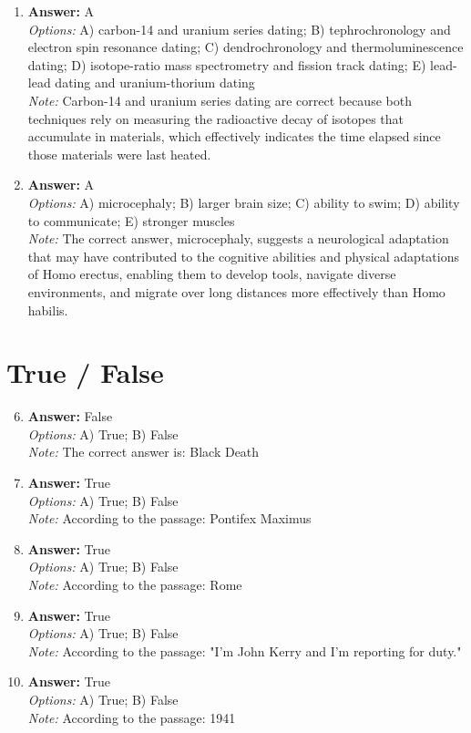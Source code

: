 \documentclass[12pt]{article}
\begin{document}
\begin{enumerate}[label=\arabic*.]
\item \textbf{Answer:} A
\\ \textit{Options:} A) carbon-14 and uranium series dating; B) tephrochronology and electron spin resonance dating; C) dendrochronology and thermoluminescence dating; D) isotope-ratio mass spectrometry and fission track dating; E) lead-lead dating and uranium-thorium dating
\\ \textit{Note:} Carbon-14 and uranium series dating are correct because both techniques rely on measuring the radioactive decay of isotopes that accumulate in materials, which effectively indicates the time elapsed since those materials were last heated.
\item \textbf{Answer:} A
\\ \textit{Options:} A) microcephaly; B) larger brain size; C) ability to swim; D) ability to communicate; E) stronger muscles
\\ \textit{Note:} The correct answer, microcephaly, suggests a neurological adaptation that may have contributed to the cognitive abilities and physical adaptations of Homo erectus, enabling them to develop tools, navigate diverse environments, and migrate over long distances more effectively than Homo habilis.
\end{enumerate}

\section*{True / False}
\begin{enumerate}[label=\arabic*.]
\setcounter{enumi}{5}
\item \textbf{Answer:} False
\\ \textit{Options:} A) True; B) False
\\ \textit{Note:} The correct answer is: Black Death
\item \textbf{Answer:} True
\\ \textit{Options:} A) True; B) False
\\ \textit{Note:} According to the passage: Pontifex Maximus
\item \textbf{Answer:} True
\\ \textit{Options:} A) True; B) False
\\ \textit{Note:} According to the passage: Rome
\item \textbf{Answer:} True
\\ \textit{Options:} A) True; B) False
\\ \textit{Note:} According to the passage: "I'm John Kerry and I'm reporting for duty."
\item \textbf{Answer:} True
\\ \textit{Options:} A) True; B) False
\\ \textit{Note:} According to the passage: 1941
\end{enumerate}
\end{document}

